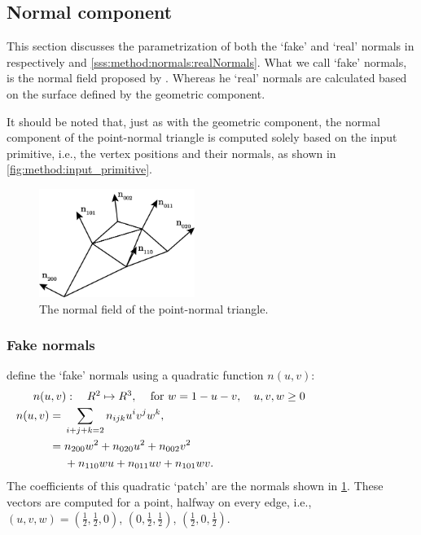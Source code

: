 
\subsection{Normal component}
\label{ss:normal_component}
	This section discusses the parametrization of both the `fake' and `real' normals in respectively  and \ref{sss:method:normals:realNormals}. What we call `fake' normals, is the normal field proposed by \citeauthor{vlachos2001curved}. Whereas he `real' normals are calculated based on the surface defined by the geometric component.

	It should be noted that, just as with the geometric component, the normal component of the point-normal triangle is computed solely based on the input primitive, i.e., the vertex positions and their normals, as shown in \cref{fig:method:input_primitive}. 

	\begin{figure}
		\centering
		\includegraphics[width=0.45\textwidth]{./content/img/method/normals.png}
		\caption{The normal field of the point-normal triangle.}
		\label{fig:method:normal_field}
	\end{figure}

\subsubsection{Fake normals}
\label{sss:method:normals:fakeNormals}
	\citeauthor{vlachos2001curved} define the `fake' normals using a quadratic function $n(u,v)$:
	\begin{align}
		\noalign{$n(u,v): \quad R^2 \mapsto R^3,\quad$ for $w = 1 - u - v, \quad u, v, w \geq 0$}
		\begin{split}\label{eq:method:quadratic_normal_patch}
		    n(u,v) ={}& \sum_{i + j + k = 2} n_{ijk}u^i v^j w^k,\\
		      	   ={}& n_{200}w^2 + n_{020}u^2 + n_{002}v^2\\
		      	    {}& + n_{110}wu + n_{011}uv + n_{101}wv.\\
		\end{split}
	\end{align}
	The coefficients of this quadratic `patch' are the normals shown in \cref{fig:method:normal_field}. These vectors are computed for a point, halfway on every edge, i.e., $(u,v,w) = (\frac{1}{2}, \frac{1}{2}, 0)$, $(0, \frac{1}{2}, \frac{1}{2})$, $(\frac{1}{2}, 0, \frac{1}{2})$. 

